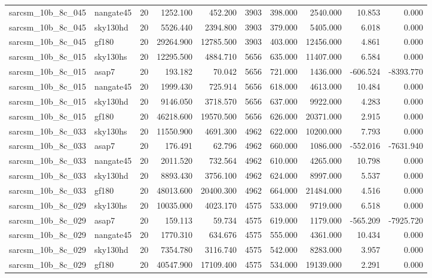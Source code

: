 \begin{tabular}{llrrrrrrrr}
sarcsm\_10b\_8c\_045 & nangate45 & 20 & 1252.100 & 452.200 & 3903 & 398.000 & 2540.000 & 10.853 & 0.000 \\
sarcsm\_10b\_8c\_045 & sky130hd & 20 & 5526.440 & 2394.800 & 3903 & 379.000 & 5405.000 & 6.018 & 0.000 \\
sarcsm\_10b\_8c\_045 & gf180 & 20 & 29264.900 & 12785.500 & 3903 & 403.000 & 12456.000 & 4.861 & 0.000 \\
sarcsm\_10b\_8c\_015 & sky130hs & 20 & 12295.500 & 4884.710 & 5656 & 635.000 & 11407.000 & 6.584 & 0.000 \\
sarcsm\_10b\_8c\_015 & asap7 & 20 & 193.182 & 70.042 & 5656 & 721.000 & 1436.000 & -606.524 & -8393.770 \\
sarcsm\_10b\_8c\_015 & nangate45 & 20 & 1999.430 & 725.914 & 5656 & 618.000 & 4613.000 & 10.484 & 0.000 \\
sarcsm\_10b\_8c\_015 & sky130hd & 20 & 9146.050 & 3718.570 & 5656 & 637.000 & 9922.000 & 4.283 & 0.000 \\
sarcsm\_10b\_8c\_015 & gf180 & 20 & 46218.600 & 19570.500 & 5656 & 626.000 & 20371.000 & 2.915 & 0.000 \\
sarcsm\_10b\_8c\_033 & sky130hs & 20 & 11550.900 & 4691.300 & 4962 & 622.000 & 10200.000 & 7.793 & 0.000 \\
sarcsm\_10b\_8c\_033 & asap7 & 20 & 176.491 & 62.796 & 4962 & 660.000 & 1086.000 & -552.016 & -7631.940 \\
sarcsm\_10b\_8c\_033 & nangate45 & 20 & 2011.520 & 732.564 & 4962 & 610.000 & 4265.000 & 10.798 & 0.000 \\
sarcsm\_10b\_8c\_033 & sky130hd & 20 & 8893.430 & 3756.100 & 4962 & 624.000 & 8997.000 & 5.537 & 0.000 \\
sarcsm\_10b\_8c\_033 & gf180 & 20 & 48013.600 & 20400.300 & 4962 & 664.000 & 21484.000 & 4.516 & 0.000 \\
sarcsm\_10b\_8c\_029 & sky130hs & 20 & 10035.000 & 4023.170 & 4575 & 533.000 & 9719.000 & 6.518 & 0.000 \\
sarcsm\_10b\_8c\_029 & asap7 & 20 & 159.113 & 59.734 & 4575 & 619.000 & 1179.000 & -565.209 & -7925.720 \\
sarcsm\_10b\_8c\_029 & nangate45 & 20 & 1770.310 & 634.676 & 4575 & 555.000 & 4361.000 & 10.434 & 0.000 \\
sarcsm\_10b\_8c\_029 & sky130hd & 20 & 7354.780 & 3116.740 & 4575 & 542.000 & 8283.000 & 3.957 & 0.000 \\
sarcsm\_10b\_8c\_029 & gf180 & 20 & 40547.900 & 17109.400 & 4575 & 534.000 & 19139.000 & 2.291 & 0.000 \\

\end{tabular}

